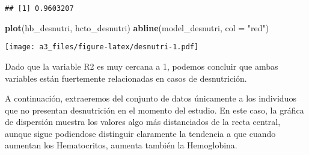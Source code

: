 \documentclass[]{article}
\newenvironment{Shaded}{\begin{snugshade}}{\end{snugshade}}
\newcommand{\DataTypeTok}[1]{\textcolor[rgb]{0.13,0.29,0.53}{#1}}
\newcommand{\KeywordTok}[1]{\textcolor[rgb]{0.13,0.29,0.53}{\textbf{#1}}}
\newcommand{\NormalTok}[1]{#1}
\newcommand{\OperatorTok}[1]{\textcolor[rgb]{0.81,0.36,0.00}{\textbf{#1}}}
\newcommand{\StringTok}[1]{\textcolor[rgb]{0.31,0.60,0.02}{#1}}
\begin{document}
\begin{Shaded}
\end{Shaded}

\begin{verbatim}
## [1] 0.9603207
\end{verbatim}

\begin{Shaded}
\begin{Highlighting}[]
\KeywordTok{plot}\NormalTok{(hb_desnutri, hcto_desnutri)}
\KeywordTok{abline}\NormalTok{(model_desnutri, }\DataTypeTok{col =} \StringTok{"red"}\NormalTok{)}
\end{Highlighting}
\end{Shaded}

\texttt{[image: a3\_files/figure-latex/desnutri-1.pdf]}

Dado que la variable R2 es muy cercana a 1, podemos concluir que ambas
variables están fuertemente relacionadas en casos de desnutrición.

A continuación, extraeremos del conjunto de datos únicamente a los
individuos que no presentan desnutrición en el momento del estudio. En
este caso, la gráfica de dispersión muestra los valores algo más
distanciados de la recta central, aunque sigue podiendose distinguir
claramente la tendencia a que cuando aumentan los Hematocritos, aumenta
también la Hemoglobina.

\begin{Shaded}
\end{Shaded}
\end{document}
